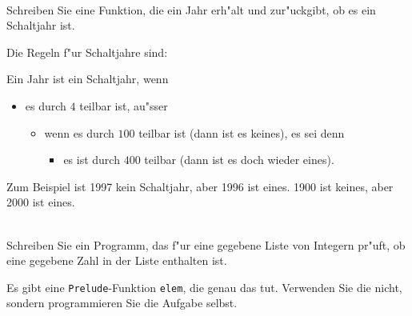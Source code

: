 \newcommand{\printpraesenzlsg}{false}
\newcommand{\printloesungen}{false}
\newcommand{\printbewertungen}{false}
\newcommand{\blattnummer}{2}



\iforiginal{}

	

 \\
Schreiben Sie eine Funktion, die ein Jahr erh"alt und zur"uckgibt, ob es ein Schaltjahr ist.

Die Regeln f"ur Schaltjahre sind: 

Ein Jahr ist ein Schaltjahr, wenn
\begin{itemize}
  \item es durch $4$ teilbar ist, au"sser
  \begin{itemize}
    \item wenn es durch $100$ teilbar ist (dann ist es keines), es sei denn 
    \begin{itemize}
      \item es ist durch $400$ teilbar (dann ist es doch wieder eines).
    \end{itemize}
  \end{itemize}
\end{itemize}

Zum Beispiel ist 1997 kein Schaltjahr, aber 1996 ist eines. 1900 ist keines, aber 2000 ist eines.

\\
Schreiben Sie ein Programm, das f"ur eine gegebene Liste von Integern pr"uft, ob eine gegebene Zahl in der Liste enthalten ist.
\begin{notes}
  Es gibt eine \texttt{Prelude}-Funktion \texttt{elem}, die genau das tut. Verwenden Sie die nicht, sondern programmieren Sie die Aufgabe selbst.
\end{notes}
  

